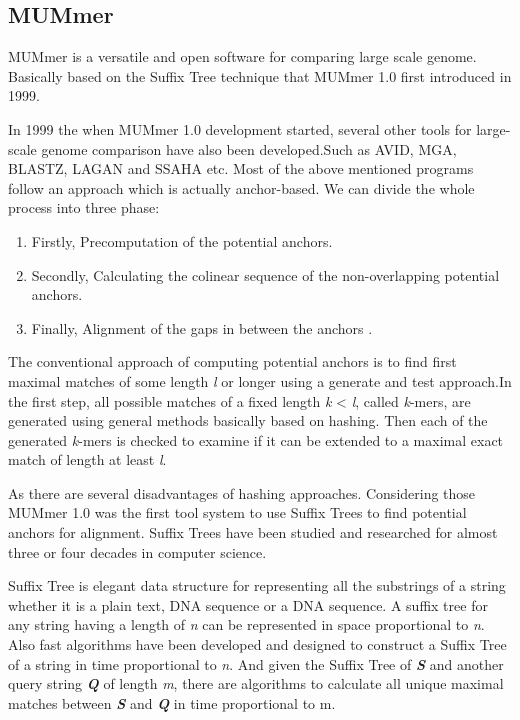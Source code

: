 \documentclass{standalone}
\begin{document}
\subsection{MUMmer}
MUMmer is a versatile and open software for comparing large scale genome. Basically based on the Suffix Tree technique that MUMmer 1.0 first introduced in 1999.
\par 
In 1999 the when MUMmer 1.0 development started, several other tools for large-scale  genome comparison have also been developed.Such as AVID\cite{AVID}, MGA\cite{MGA}, BLASTZ\cite{BLASTZ}, LAGAN\cite{LAGAN} and SSAHA\cite{SSAHA} etc. Most of the above mentioned  programs follow an approach which is actually anchor-based. We can divide the whole process into three phase:
\begin{enumerate}
	\item Firstly, Precomputation of the potential anchors.
	\item Secondly, Calculating the colinear sequence of the non-overlapping potential anchors.
	\item Finally, Alignment of the gaps in between the anchors .
\end{enumerate}
The conventional approach of computing potential anchors is to find first maximal matches of some length {\emph{l}} or longer using a generate and test approach.In the first step, all possible matches of a fixed length \emph{k} < \emph{l}, called \emph{k}-mers, are generated using general methods basically based on hashing. Then each of the generated \emph{k}-mers is checked to examine if it can be extended to a maximal exact match of length at least \emph{l}.
\par 
As there are several disadvantages of hashing approaches. Considering those MUMmer 1.0 was the first tool system to use Suffix Trees to find potential anchors for alignment. Suffix Trees have been studied and researched for almost three or four decades in computer science.
\par 
Suffix Tree is elegant data structure for representing all the substrings of a string whether it is a plain text, DNA sequence or a DNA sequence. A suffix tree for any string having a length of \emph{n} can be represented in space proportional to \emph{n}. Also fast algorithms have been developed and designed to construct a Suffix Tree of a string in time proportional to \emph{n}\cite{LINPAT, SEST}. And given the Suffix Tree of {\bf \emph{S}} and another query string {\bf \emph{Q}} of length \emph{m}, there are algorithms to calculate all unique maximal matches between {\bf \emph{S}} and {\bf \emph{Q}} in time proportional to m.
\end{document}
